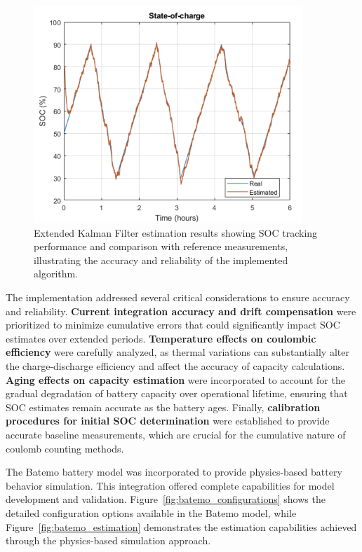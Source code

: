 \begin{figure}[htbp]
\centering
\includegraphics[width=0.9\textwidth]{imgs/EKF_results.png}
\caption{Extended Kalman Filter estimation results showing SOC tracking performance and comparison with reference measurements, illustrating the accuracy and reliability of the implemented algorithm.}
\label{fig:ekf_results}
\end{figure} 

The implementation addressed several critical considerations to ensure accuracy and reliability. \textbf{Current integration accuracy and drift compensation} were prioritized to minimize cumulative errors that could significantly impact SOC estimates over extended periods. \textbf{Temperature effects on coulombic efficiency} were carefully analyzed, as thermal variations can substantially alter the charge-discharge efficiency and affect the accuracy of capacity calculations. \textbf{Aging effects on capacity estimation} were incorporated to account for the gradual degradation of battery capacity over operational lifetime, ensuring that SOC estimates remain accurate as the battery ages. Finally, \textbf{calibration procedures for initial SOC determination} were established to provide accurate baseline measurements, which are crucial for the cumulative nature of coulomb counting methods.

The Batemo battery model was incorporated to provide physics-based battery behavior simulation. This integration offered complete capabilities for model development and validation. Figure~\ref{fig:batemo_configurations} shows the detailed configuration options available in the Batemo model, while Figure~\ref{fig:batemo_estimation} demonstrates the estimation capabilities achieved through the physics-based simulation approach.

